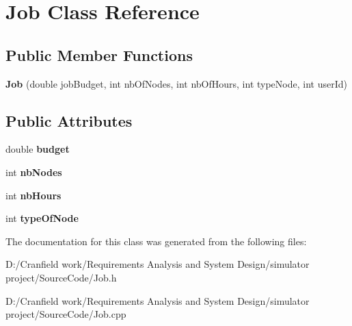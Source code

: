 \hypertarget{class_job}{}\section{Job Class Reference}
\label{class_job}
\subsection*{Public Member Functions}
\begin{DoxyCompactItemize}
\item 
\mbox{\label{class_job_a47efbc618f9062b60684f79600d985d8}} 
{\bfseries Job} (double job\+Budget, int nb\+Of\+Nodes, int nb\+Of\+Hours, int type\+Node, int user\+Id)
\end{DoxyCompactItemize}
\subsection*{Public Attributes}
\begin{DoxyCompactItemize}
\item 
\mbox{\label{class_job_af31fad3ece1ef31d18d79435b8d002dc}} 
double {\bfseries budget}
\item 
\mbox{\label{class_job_ae09a41715c749301bf627184d554a1d4}} 
int {\bfseries nb\+Nodes}
\item 
\mbox{\label{class_job_a6319e0142efd380b45893f719856823e}} 
int {\bfseries nb\+Hours}
\item 
\mbox{\label{class_job_a1aa451e277ebcc805a277dee15d34d44}} 
int {\bfseries type\+Of\+Node}
\end{DoxyCompactItemize}


The documentation for this class was generated from the following files\+:\begin{DoxyCompactItemize}
\item 
D\+:/\+Cranfield work/\+Requirements Analysis and System Design/simulator project/\+Source\+Code/Job.\+h\item 
D\+:/\+Cranfield work/\+Requirements Analysis and System Design/simulator project/\+Source\+Code/Job.\+cpp\end{DoxyCompactItemize}
